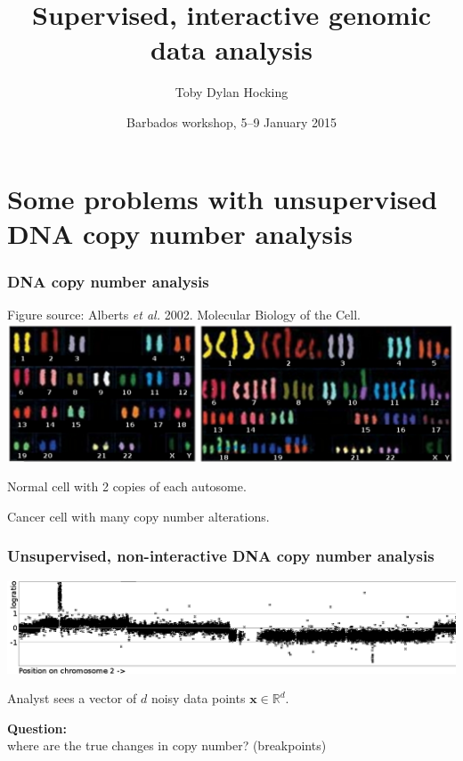 \documentclass{beamer}
\newcommand{\RR}{\mathbb R}
\begin{document}
\title{Supervised, interactive genomic data analysis}
\author{
Toby Dylan Hocking
}

\date{Barbados workshop, 5--9 January 2015}

\maketitle

\section{Some problems with unsupervised
  DNA copy number analysis}

\begin{frame}
  \frametitle{DNA copy number analysis}

  Figure source: Alberts \emph{et al.} 2002. Molecular Biology of the Cell.
\vskip 0.1in
  \includegraphics[width=\textwidth]{Karyo-both}
\vskip 0.1in
  \begin{minipage}{0.4\linewidth}
    Normal cell with 2 copies of each autosome.
  \end{minipage}
\linewidth
  \begin{minipage}{0.4\linewidth}
Cancer cell with many copy number alterations.
  \end{minipage}

\end{frame}

\begin{frame}
  \frametitle{Unsupervised, non-interactive DNA copy number analysis}
  \includegraphics[width=\textwidth]{unlabeled-axes}

  Analyst sees a vector of $d$ noisy data points $\mathbf x\in\RR^d$.

  \vskip 0.1in

  \textbf{Question:}\\
  where are the true changes in copy
  number? (breakpoints)

\end{frame}
\end{document}
